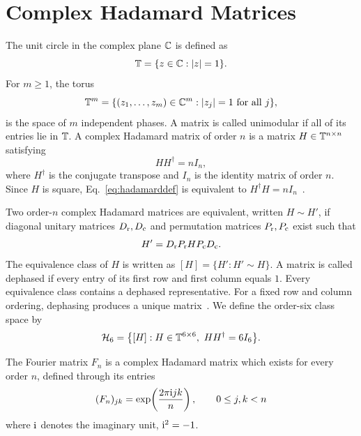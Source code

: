 \section{Complex Hadamard Matrices}
\label{sec:definition_hadamard}
\begin{definition}
\label{def:hadamard}
The unit circle in the complex plane $\mathbb C$ is defined as
\begin{equation}
\mathbb T=\{z\in\mathbb C:|z|=1\}.
\label{eq:unitcircle}
\end{equation}
For $m\geq1$, the torus
\begin{equation}
    \mathbb T^m=\{(z_1,\ldots,z_m)\in\mathbb C^m:|z_j|=1\ \text{for all }j\},
\end{equation}
is the space of $m$ independent phases. 
A matrix is called unimodular if all of its entries lie in $\mathbb T$.
A complex Hadamard matrix of order $n$ is a matrix
$H\in\mathbb T^{n\times n}$ satisfying
\begin{equation}
HH^{\dagger}=nI_n,
\label{eq:hadamarddef}
\end{equation}
where $H^{\dagger}$ is the conjugate transpose and $I_n$ is the identity matrix of order $n$. Since $H$ is square, Eq.~\eqref{eq:hadamarddef} is equivalent to
$H^{\dagger}H=nI_n$~\cite{TadejZyczkowski2006}.
\end{definition}

\begin{definition}
\label{def:equivalence}
Two order-$n$ complex Hadamard matrices are equivalent, written $H\sim H'$, if diagonal unitary matrices $D_{\rm r},D_{\rm c}$ and permutation matrices $P_{\rm r},P_{\rm c}$ exist such that
\begin{equation}
H'=D_{\rm r}P_{\rm r}HP_{\rm c}D_{\rm c}.
\label{eq:equivalence}
\end{equation}
The equivalence class of $H$ is written as $[H]=\{H':H'\sim H\}$. 
A matrix is called dephased if every entry of its first row and first column equals $1$. Every equivalence class contains a dephased representative. 
For a fixed row and column ordering, dephasing produces a unique matrix~\cite{TadejZyczkowski2006,Szollosi2012FourParameter}.
We define the order-six class space by
\begin{equation}
\mathcal H_6 =\bigl\{[H]:H\in\mathbb T^{6\times6},\ HH^{\dagger}=6I_6\bigr\}.
\label{eq:H6classes}
\end{equation}
\end{definition}

\begin{definition}
\label{def:fouriermatrix}
The Fourier matrix $F_n$ is a complex Hadamard matrix which exists for every order $n$, defined through its entries
\begin{equation}
(F_n)_{jk}=\exp\!\left(\frac{2\pi\mathrm i jk}{n}\right),
\qquad 0\leq j,k<n
\label{eq:fouriern}
\end{equation}
where $\mathrm i$ denotes the imaginary unit,
$\mathrm i^2=-1$. 
\end{definition}

